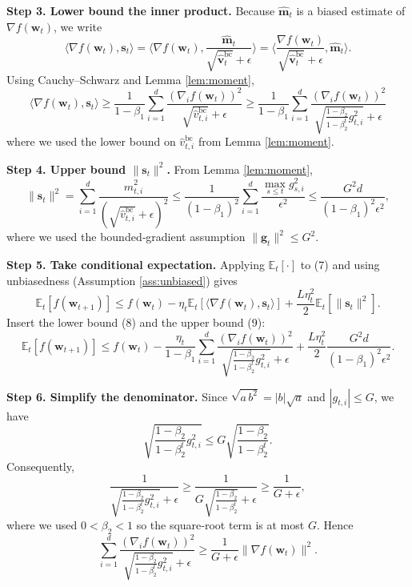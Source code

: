 \documentclass{article}
\begin{document}
\noindent\textbf{Step 3. Lower bound the inner product.}  
Because $\widehat{\mathbf{m}}_t$ is a biased estimate of $\nabla f(\mathbf{w}_t)$, we write
\[
\langle\nabla f(\mathbf{w}_t),\mathbf{s}_t\rangle
=\Big\langle\nabla f(\mathbf{w}_t),\frac{\widehat{\mathbf{m}}_t}{\sqrt{\widehat{\mathbf{v}}_t^{\mathrm{bc}}}+\epsilon}\Big\rangle
=\Big\langle\frac{\nabla f(\mathbf{w}_t)}{\sqrt{\widehat{\mathbf{v}}_t^{\mathrm{bc}}}+\epsilon},
\widehat{\mathbf{m}}_t\Big\rangle .
\]
Using Cauchy–Schwarz and Lemma \ref{lem:moment},
\[
\langle\nabla f(\mathbf{w}_t),\mathbf{s}_t\rangle
\ge\frac{1}{1-\beta_1}\sum_{i=1}^{d}
\frac{(\nabla_i f(\mathbf{w}_t))^2}{\sqrt{\widehat v_{t,i}^{\mathrm{bc}}}+\epsilon}
\ge\frac{1}{1-\beta_1}\sum_{i=1}^{d}
\frac{(\nabla_i f(\mathbf{w}_t))^2}{\sqrt{\frac{1-\beta_2}{1-\beta_2^t}g_{t,i}^2}+\epsilon}
\tag{8}
\]
where we used the lower bound on $\widehat v_{t,i}^{\mathrm{bc}}$ from Lemma \ref{lem:moment}.

\noindent\textbf{Step 4. Upper bound $\|\mathbf{s}_t\|^2$.}  
From Lemma \ref{lem:moment},
\[
\|\mathbf{s}_t\|^2
= \sum_{i=1}^{d}\frac{\widehat m_{t,i}^2}{(\sqrt{\widehat v_{t,i}^{\mathrm{bc}}}+\epsilon)^2}
\le \frac{1}{(1-\beta_1)^2}\sum_{i=1}^{d}
\frac{\max_{s\le t}g_{s,i}^2}{\epsilon^2}
\le \frac{G^2 d}{(1-\beta_1)^2\epsilon^2},
\tag{9}
\]
where we used the bounded‑gradient assumption $\|\mathbf{g}_t\|^2\le G^2$.

\noindent\textbf{Step 5. Take conditional expectation.}  
Applying $\mathbb{E}_t[\cdot]$ to (7) and using unbiasedness (Assumption \ref{ass:unbiased}) gives
\[
\mathbb{E}_t[f(\mathbf{w}_{t+1})]\le f(\mathbf{w}_t)
-\eta_t\mathbb{E}_t\!\left[\langle\nabla f(\mathbf{w}_t),\mathbf{s}_t\rangle\right]
+\frac{L\eta_t^{2}}{2}\mathbb{E}_t[\|\mathbf{s}_t\|^2].
\tag{10}
\]
Insert the lower bound (8) and the upper bound (9):
\[
\mathbb{E}_t[f(\mathbf{w}_{t+1})]\le f(\mathbf{w}_t)
-\frac{\eta_t}{1-\beta_1}\sum_{i=1}^{d}
\frac{(\nabla_i f(\mathbf{w}_t))^2}
{\sqrt{\frac{1-\beta_2}{1-\beta_2^t}g_{t,i}^2}+\epsilon}
+\frac{L\eta_t^{2}}{2}\frac{G^2 d}{(1-\beta_1)^2\epsilon^2}.
\tag{11}
\]

\noindent\textbf{Step 6. Simplify the denominator.}  
Since $\sqrt{a\,b^2}=|b|\sqrt{a}$ and $|g_{t,i}|\le G$, we have
\[
\sqrt{\frac{1-\beta_2}{1-\beta_2^t}g_{t,i}^2}
\le G\sqrt{\frac{1-\beta_2}{1-\beta_2^t}}.
\]
Consequently,
\[
\frac{1}{\sqrt{\frac{1-\beta_2}{1-\beta_2^t}g_{t,i}^2}+\epsilon}
\ge\frac{1}{G\sqrt{\frac{1-\beta_2}{1-\beta_2^t}}+\epsilon}
\ge\frac{1}{G+\epsilon},
\]
where we used $0<\beta_2<1$ so the square‑root term is at most $G$. Hence
\[
\sum_{i=1}^{d}
\frac{(\nabla_i f(\mathbf{w}_t))^2}
{\sqrt{\frac{1-\beta_2}{1-\beta_2^t}g_{t,i}^2}+\epsilon}
\ge\frac{1}{G+\epsilon}\|\nabla f(\mathbf{w}_t)\|^2 .
\tag{12}
\]
\end{document}
